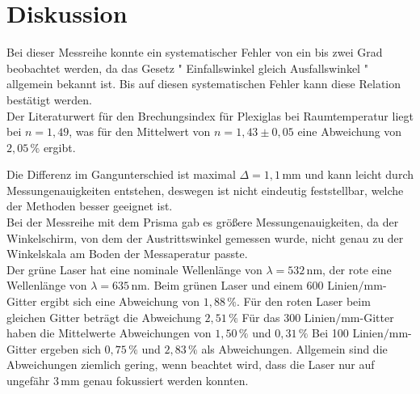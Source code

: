 \section{Diskussion}
\label{sec:Diskussion}

Bei dieser Messreihe konnte ein systematischer Fehler von ein bis zwei Grad beobachtet werden, da das Gesetz " Einfallswinkel gleich Ausfallswinkel " allgemein bekannt ist.
Bis auf diesen systematischen Fehler kann diese Relation bestätigt werden. \\

Der Literaturwert für den Brechungsindex für Plexiglas bei Raumtemperatur liegt bei $n =  1,49 $\cite{ap02}, was für den Mittelwert von $n = 1,43 \pm 0,05$ eine Abweichung von $2,05 \,\% $ ergibt.

Die Differenz im Gangunterschied ist maximal $\varDelta  = 1,1 \,\unit{\milli\meter}$ und kann leicht durch Messungenauigkeiten entstehen, deswegen ist nicht eindeutig feststellbar, 
welche der Methoden besser geeignet ist. \\

Bei der Messreihe mit dem Prisma gab es größere Messungenauigkeiten, da der Winkelschirm, von dem der Austrittswinkel gemessen wurde, nicht genau zu der Winkelskala am Boden der Messaperatur passte. \\

Der grüne Laser hat eine nominale Wellenlänge von $\lambda = 532 \,\unit{\nano\meter}$, der rote eine Wellenlänge von $\lambda = 635  \,\unit{\nano\meter}$\cite{ap02}.
Beim grünen Laser und einem 600 Linien$\mathbin{/} \unit{\milli\meter}$-Gitter ergibt sich eine Abweichung von $ 1,88 \, \% $. Für den roten Laser beim gleichen Gitter beträgt die Abweichung $ 2,51 \, \% $
Für das 300 Linien$\mathbin{/} \unit{\milli\meter}$-Gitter haben die Mittelwerte Abweichungen von $ 1,50 \, \% $ und  $ 0,31 \, \% $
Bei 100 Linien$\mathbin{/} \unit{\milli\meter}$-Gitter ergeben sich $ 0,75 \, \% $ und $ 2,83 \, \% $ als Abweichungen. 
Allgemein sind die Abweichungen ziemlich gering, wenn beachtet wird, dass die Laser nur auf ungefähr $3 \,\unit{\milli\meter}$ genau fokussiert werden konnten. 